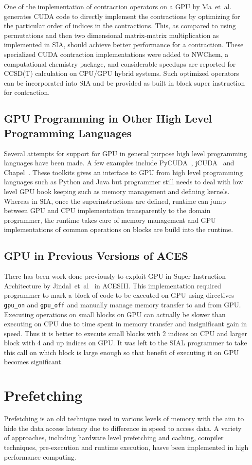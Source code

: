 One of the implementation of contraction operators on a GPU by
Ma~et~al.~\cite{Ma2013} generates CUDA code to directly implement the contractions
by optimizing for the particular order of indices in the contractions. This, as
compared to using permutations and then two dimensional matrix-matrix multiplication
as implemented in SIA, should achieve better performance for a contraction. These
specialized CUDA contraction implementations were added to NWChem, a computational
chemistry package, and considerable speedups are reported for CCSD(T) calculation
on CPU/GPU hybrid systems. Such optimized operators can be incorporated into SIA
and be provided as built in block super instruction for contraction.

\subsection{GPU Programming in Other High Level Programming Languages}
Several attempts for support for GPU in general purpose high level programming
languages have been made. A few examples include PyCUDA~\cite{pycuda2011},
jCUDA~\cite{jcuda2009} and Chapel~\cite{chapelgpu}. These toolkits gives an interface
to GPU from high level programming languages such as Python and Java but
programmer still needs to deal with low level GPU book keeping such as memory
management and defining kernels. Whereas in SIA, once the superinstructions are
defined, runtime can jump between GPU and CPU implementation transparently to
the domain programmer, the runtime takes care of memory management and GPU
implementations of common operations on blocks are build into the runtime.

\subsection{GPU in Previous Versions of ACES}
There has been work done previously to exploit GPU in Super Instruction
Architecture by Jindal~et~al~\cite{jindal2016gpusial} in ACESIII. This implementation
required programmer to mark a block of code to be executed on GPU using
directives \texttt{gpu\_on} and \texttt{gpu\_off} and manually manage memory
transfer to and from GPU. Executing operations on small blocks on GPU can
actually be slower than executing on CPU due to time spent in memory transfer and
insignificant gain in speed. Thus it is better to execute small blocks with 2
indices on CPU and larger block with 4 and up indices on GPU. It was left to the
SIAL programmer to take this call on which block is large enough so that benefit
of executing it on GPU becomes significant.

\section{Prefetching}
Prefetching is an old technique used in various levels of memory with the aim to
hide the data access latency due to difference in speed to access data. A variety
of approaches, including hardware level prefetching and caching, compiler techniques,
pre-execution and runtime execution, hasve been implemented in high performance
computing.
